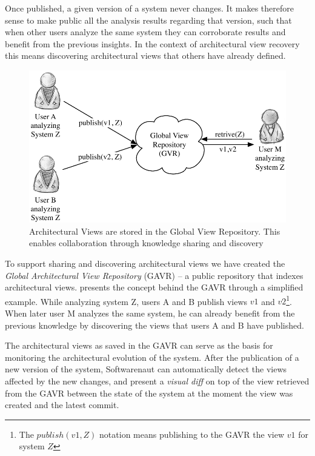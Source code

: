 \documentclass[preprint,12pt]{elsarticle}
\begin{document}
Once published, a given version of a system never changes. It makes therefore sense to make public all the analysis results regarding that version, such that when other users analyze the same system they can corroborate results and benefit from the previous insights. In the context of architectural view recovery this means discovering architectural views that others have already defined. 

\begin{figure}[ht]
\begin{center}
\includegraphics[width=0.7\linewidth]{images/CollaborationConcept}
\caption{Architectural Views are stored in the Global View Repository. This enables collaboration through knowledge sharing and discovery}
\end{center}
\end{figure}


To support sharing and discovering architectural views we have created the {\em Global Architectural View Repository} (GAVR) -- a public repository that indexes architectural views.  presents the concept behind the GAVR through a simplified example. While analyzing system Z, users A and B publish views $v1$ and $v2$\footnote{The $publish(v1,Z)$ notation means publishing to the GAVR the view $v1$ for system $Z$}. When later user M analyzes the same system, he can already benefit from the previous knowledge by discovering the views that users A and B have published. 


The architectural views as saved in the GAVR can serve as the basis for monitoring the architectural evolution of the system. After the publication of a new version of the system, Softwarenaut can automatically detect the views affected by the new changes, and present a {\em visual diff} on top of the view retrieved from the GAVR between the state of the system at the moment the view was created and the latest commit.
\end{document}
